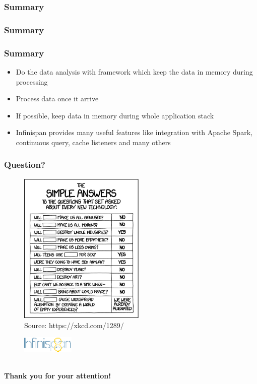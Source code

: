 \documentclass[10pt,utf8]{beamer}
\begin{document}
\begin{frame}
	\frametitle{Summary}
	\vspace{3cm}
	\vspace{3cm}
\end{frame}

\begin{frame}
	\frametitle{Summary}
	\vspace{3cm}
	\vspace{3cm}
\end{frame}


\begin{frame}
	\frametitle{Summary}
	\begin{itemize}
		\item Do the data analysis with framework which keep the data in memory during processing
		\item Process data once it arrive
		\item If possible, keep data in memory during whole application stack
		\item Infinispan provides many useful features like integration with Apache Spark, continuous query, cache listeners and many others
	\end{itemize}
\end{frame}


\begin{frame}
	\frametitle{Question?}
	\begin{figure}
		\centering
		\includegraphics[width=6cm]{./img/simple_answers.eps}
		\caption{\tiny{Source: https://xkcd.com/1289/}}
	\end{figure}
\end{frame}

\begin{frame}
	\begin{figure}
		\centering
		\includegraphics[width=2.5cm]{./img/infinispan8.eps}
	\end{figure}
	\centering
	\large{} \\
	\vspace{1cm}
	\huge{\textbf{Thank you for your attention!}} \\
\end{frame}
\end{document}
